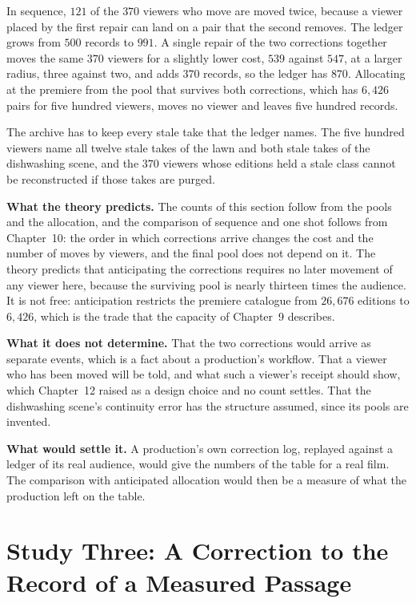 \documentclass[11pt,twoside,openright]{book}
\theoremstyle{plain}
\theoremstyle{definition}
\theoremstyle{remark}
\begin{document}
In sequence, $121$ of the $370$ viewers who move are moved twice, because a viewer placed by the first repair can land on a pair that the second removes. The ledger grows from $500$ records to $991$. A single repair of the two corrections together moves the same $370$ viewers for a slightly lower cost, $539$ against $547$, at a larger radius, three against two, and adds $370$ records, so the ledger has $870$. Allocating at the premiere from the pool that survives both corrections, which has $6{,}426$ pairs for five hundred viewers, moves no viewer and leaves five hundred records.

The archive has to keep every stale take that the ledger names. The five hundred viewers name all twelve stale takes of the lawn and both stale takes of the dishwashing scene, and the $370$ viewers whose editions held a stale class cannot be reconstructed if those takes are purged.

\textbf{What the theory predicts.} The counts of this section follow from the pools and the allocation, and the comparison of sequence and one shot follows from Chapter~10: the order in which corrections arrive changes the cost and the number of moves by viewers, and the final pool does not depend on it. The theory predicts that anticipating the corrections requires no later movement of any viewer here, because the surviving pool is nearly thirteen times the audience. It is not free: anticipation restricts the premiere catalogue from $26{,}676$ editions to $6{,}426$, which is the trade that the capacity of Chapter~9 describes.

\textbf{What it does not determine.} That the two corrections would arrive as separate events, which is a fact about a production's workflow. That a viewer who has been moved will be told, and what such a viewer's receipt should show, which Chapter~12 raised as a design choice and no count settles. That the dishwashing scene's continuity error has the structure assumed, since its pools are invented.

\textbf{What would settle it.} A production's own correction log, replayed against a ledger of its real audience, would give the numbers of the table for a real film. The comparison with anticipated allocation would then be a measure of what the production left on the table.

\section{Study Three: A Correction to the Record of a Measured Passage}\label{sec:passage17}
\end{document}
